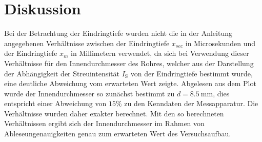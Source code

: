\section{Diskussion}
\label{sec:Diskussion}
Bei der Betrachtung der Eindringtiefe wurden nicht die in der Anleitung angegebenen Verhältnisse zwischen der Eindringtiefe $x_{sec}$ in Microsekunden und der Eindringtiefe $x_{m}$ in Millimetern verwendet, da sich bei Verwendung dieser Verhältnisse für den Innendurchmesser des Rohres, welcher aus der Darstellung der Abhängigkeit der Streuintensität $I_{\mathrm{S}}$ von der Eindringtiefe bestimmt wurde, eine deutliche Abweichung vom erwarteten Wert zeigte.
Abgelesen aus dem Plot wurde der Innendurchmesser so zunächst bestimmt zu $d=\SI{8.5}{\milli\meter}$, dies entspricht einer Abweichung von $15\%$ zu den Kenndaten der Messapparatur.
Die Verhältnisse wurden daher exakter berechnet. Mit den so berechneten Verhältnissen ergibt sich der Innendurchmesser im Rahmen von Ableseungenauigkeiten genau zum erwarteten Wert des Versuchsaufbau.  
